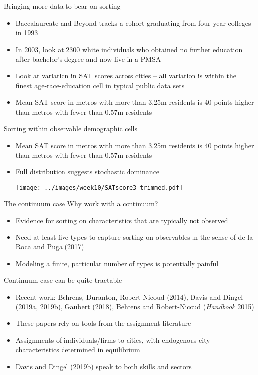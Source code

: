\documentclass[10pt,notes=hide]{beamer}
\begin{document}
\begin{frame}{Bringing more data to bear on sorting}
\begin{itemize}
	\item Baccalaureate and Beyond tracks a cohort graduating from four-year colleges in 1993 
	\item In 2003, look at 2300 white individuals who obtained no further education after bachelor's degree and now live in a PMSA
	\item Look at variation in SAT scores across cities -- all variation is within the finest age-race-education cell in typical public data sets
	\item Mean SAT score in metros with more than 3.25m residents is 40 points higher than metros with fewer than 0.57m residents
\end{itemize}
\end{frame}
\begin{frame}{Sorting within observable demographic cells}
\begin{itemize}
	\item Mean SAT score in metros with more than 3.25m residents is 40 points higher than metros with fewer than 0.57m residents
	\item Full distribution suggests stochastic dominance
	\begin{center}\texttt{[image: ../images/week10/SATscore3\_trimmed.pdf]}\end{center}
\end{itemize}
\end{frame}
\begin{frame}{The continuum case}
Why work with a continuum?
\begin{itemize}
	\item Evidence for sorting on characteristics that are typically not observed
	\item Need at least five types to capture sorting on observables in the sense of de la Roca and Puga (2017)
	\item Modeling a finite, particular number of types is potentially painful
\end{itemize}
Continuum case can be quite tractable
\begin{itemize}
	\item Recent work: \href{https://ideas.repec.org/a/ucp/jpolec/doi10.1086-675534.html}{Behrens, Duranton, Robert-Nicoud (2014)}, \href{http://faculty.chicagobooth.edu/jonathan.dingel/}{Davis and Dingel (2019a, 2019b)}, \href{https://www.aeaweb.org/articles?id=10.1257/aer.20150361}{Gaubert (2018)}, \href{http://www.sciencedirect.com/science/article/pii/B9780444595171000040}{Behrens and Robert-Nicoud (\emph{Handbook} 2015)}
	\item These papers rely on tools from the assignment literature
	\item Assignments of individuals/firms to cities, with endogenous city characteristics determined in equilibrium
	\item Davis and Dingel (2019b) speak to both skills and sectors
\end{itemize}
\end{frame}
\end{document}
